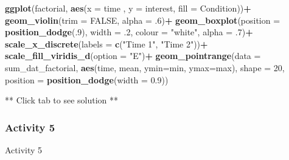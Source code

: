 \documentclass[]{book}
\newenvironment{Shaded}{\begin{snugshade}}{\end{snugshade}}
\newcommand{\DataTypeTok}[1]{\textcolor[rgb]{0.13,0.29,0.53}{#1}}
\newcommand{\DecValTok}[1]{\textcolor[rgb]{0.00,0.00,0.81}{#1}}
\newcommand{\FloatTok}[1]{\textcolor[rgb]{0.00,0.00,0.81}{#1}}
\newcommand{\KeywordTok}[1]{\textcolor[rgb]{0.13,0.29,0.53}{\textbf{#1}}}
\newcommand{\NormalTok}[1]{#1}
\newcommand{\OperatorTok}[1]{\textcolor[rgb]{0.81,0.36,0.00}{\textbf{#1}}}
\newcommand{\OtherTok}[1]{\textcolor[rgb]{0.56,0.35,0.01}{#1}}
\newcommand{\StringTok}[1]{\textcolor[rgb]{0.31,0.60,0.02}{#1}}
\begin{document}
\begin{Shaded}
\begin{Highlighting}[]
\KeywordTok{ggplot}\NormalTok{(factorial, }\KeywordTok{aes}\NormalTok{(}\DataTypeTok{x =}\NormalTok{ time , }\DataTypeTok{y =}\NormalTok{ interest, }\DataTypeTok{fill =}\NormalTok{ Condition))}\OperatorTok{+}
\StringTok{  }\KeywordTok{geom_violin}\NormalTok{(}\DataTypeTok{trim =} \OtherTok{FALSE}\NormalTok{, }\DataTypeTok{alpha =} \FloatTok{.6}\NormalTok{)}\OperatorTok{+}
\StringTok{  }\KeywordTok{geom_boxplot}\NormalTok{(}\DataTypeTok{position =} \KeywordTok{position_dodge}\NormalTok{(.}\DecValTok{9}\NormalTok{), }\DataTypeTok{width =} \FloatTok{.2}\NormalTok{, }\DataTypeTok{colour =} \StringTok{"white"}\NormalTok{, }\DataTypeTok{alpha =} \FloatTok{.7}\NormalTok{)}\OperatorTok{+}
\StringTok{  }\KeywordTok{scale_x_discrete}\NormalTok{(}\DataTypeTok{labels =} \KeywordTok{c}\NormalTok{(}\StringTok{"Time 1"}\NormalTok{, }\StringTok{"Time 2"}\NormalTok{))}\OperatorTok{+}
\StringTok{  }\KeywordTok{scale_fill_viridis_d}\NormalTok{(}\DataTypeTok{option =} \StringTok{"E"}\NormalTok{)}\OperatorTok{+}
\StringTok{  }\KeywordTok{geom_pointrange}\NormalTok{(}\DataTypeTok{data =}\NormalTok{ sum_dat_factorial,}
                  \KeywordTok{aes}\NormalTok{(time, mean, }\DataTypeTok{ymin=}\NormalTok{min, }\DataTypeTok{ymax=}\NormalTok{max),}
                  \DataTypeTok{shape =} \DecValTok{20}\NormalTok{, }
                  \DataTypeTok{position =} \KeywordTok{position_dodge}\NormalTok{(}\DataTypeTok{width =} \FloatTok{0.9}\NormalTok{))}
\end{Highlighting}
\end{Shaded}

** Click tab to see solution **

\hypertarget{activity-5-5}{%
\subsubsection{Activity 5}\label{activity-5-5}}

Activity 5

\begin{Shaded}
\end{Shaded}
\end{document}
